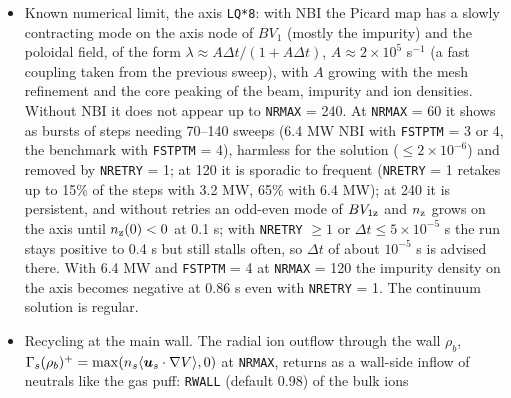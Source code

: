 \documentclass[11pt]{article}
\def\bvec#1{\leavevmode\hbox{\boldmath$#1$}}
\let\vec=\bvec
\def\r#1{{\rm#1}}
\def\aves#1{\langle#1\rangle}
\begin{document}
\begin{itemize}
  step stalls is bit-identical to \texttt{NRETRY} = 0.  The retried steps are first order in time
  (one backward-Euler substep each): with every step retried, in the initial transient of the
  JT-60U case, the error of $u_{\r{i}\phi}$ is 11 times that of BDF2 at $\Delta t = 10^{-4}$ s and halves
  with $\Delta t$, while $n_\r{e}$ and $T_\r{e}$ change by a factor 1--2.  In practice 1--15\% of the
  steps are retried, in quasi-steady phases: the JT-60U benchmark with \texttt{FSTPTM} = 4
  (206 of 15000 steps) agrees at 1.5 s with a run at $\Delta t/2$ to $4\times10^{-7}$ in $n_\r{e}$ and
  $4\times10^{-6}$ in $BV_{1\r{z}}$.  Across SAVE/LOAD it behaves as without retries.  The summary of a
  run gives the number and share of retaken steps and the finest substep, and warns when more
  than 10\% of the steps were retaken (a smaller base $\Delta t$ is then the right fix) or when
  steps did not converge even at $\Delta t/2^{\texttt{NRETRY}}$.
\item Known numerical limit, the axis \texttt{LQ*8}: with NBI the Picard map has a slowly contracting
  mode on the axis node of $BV_1$ (mostly the impurity) and the poloidal field, of the form
  $\lambda \approx A\Delta t/(1 + A\Delta t)$, $A \approx 2\times10^5$ s$^{-1}$ (a fast coupling taken
  from the previous sweep), with $A$ growing with the mesh refinement and the core peaking of the
  beam, impurity and ion densities.  Without NBI it does not appear up to \texttt{NRMAX} = 240.
  At \texttt{NRMAX} = 60 it shows as bursts of steps needing 70--140 sweeps (6.4 MW NBI with
  \texttt{FSTPTM} = 3 or 4, the benchmark with \texttt{FSTPTM} = 4), harmless for the solution
  ($\le 2\times10^{-6}$) and removed by \texttt{NRETRY} = 1; at 120 it is sporadic to frequent
  (\texttt{NRETRY} = 1 retakes up to 15\% of the steps with 3.2 MW, 65\% with 6.4 MW); at 240 it
  is persistent, and without retries an odd-even mode of $BV_{1\r{z}}$ and $n_\r{z}$ grows on the
  axis until $n_\r{z}(0) < 0$ at 0.1 s; with \texttt{NRETRY} $\ge 1$ or $\Delta t \le 5\times10^{-5}$ s the
  run stays positive to 0.4 s but still stalls often, so $\Delta t$ of about $10^{-5}$ s is advised
  there.  With 6.4 MW and \texttt{FSTPTM} = 4 at \texttt{NRMAX} = 120 the impurity density on the
  axis becomes negative at 0.86 s even with \texttt{NRETRY} = 1.  The continuum solution is regular.
\item Recycling at the main wall.  The radial ion outflow through the wall $\rho_b$,
  $\Gamma_s(\rho_b)^+ = \max(n_s\aves{\vec{u}_s\cdot\nabla V}, 0)$ at \texttt{NRMAX}, returns as a
  wall-side inflow of neutrals like the gas puff: \texttt{RWALL} (default 0.98) of the bulk ions

\end{itemize}
\end{document}
